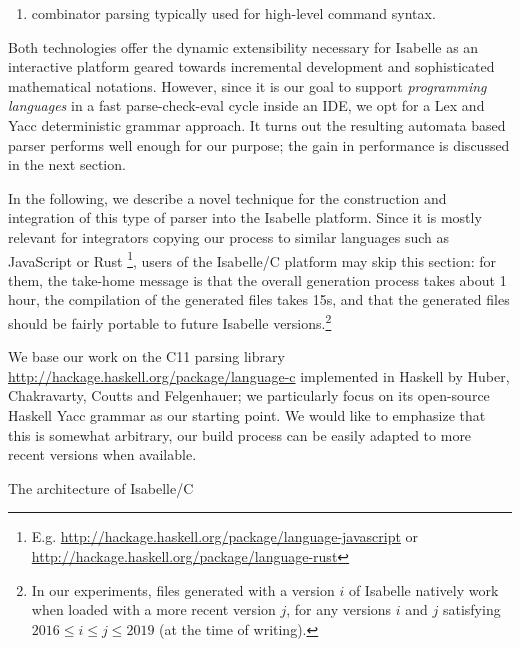 \begin{isabellebody}
\begin{isamarkuptext}
\begin{enumerate}
\item combinator parsing \cite{DBLP:journals/jfp/Hutton92} typically used for high-level 
command syntax.%
\end{enumerate}%
\end{isamarkuptext}\isamarkuptrue%
%
\begin{isamarkuptext}%
Both technologies offer the dynamic extensibility necessary for Isabelle as an
interactive platform geared towards incremental development and sophisticated mathematical
notations. However, since it is our goal to support \emph{programming languages} in
a fast parse-check-eval cycle inside an IDE, we opt for a Lex and Yacc deterministic grammar
approach. It turns out the resulting automata based parser performs well enough for our purpose; the
gain in performance is discussed in the next section.%
\end{isamarkuptext}\isamarkuptrue%
%
\begin{isamarkuptext}%
In the following, we describe a novel technique for the construction and integration of
this type of parser into the Isabelle platform. Since it is mostly relevant for integrators copying
our process to similar languages such as JavaScript or Rust \footnote{E.g.
\url{http://hackage.haskell.org/package/language-javascript} or
\url{http://hackage.haskell.org/package/language-rust}}, users of the
Isabelle/C platform may skip this section: for them, the take-home message is that the overall
generation process takes about 1 hour, the compilation of the generated files takes 15s, and that
the generated files should be fairly portable to future Isabelle versions.\footnote{In our
  experiments, files generated with a version $i$ of Isabelle natively work when loaded with a more
  recent version $j$, for any versions $i$ and $j$ satisfying $2016 \leq i \leq j \leq 2019$ (at the
  time of writing).}%
\end{isamarkuptext}\isamarkuptrue%
%
\begin{isamarkuptext}%
We base our work on the C11 parsing library
  \url{http://hackage.haskell.org/package/language-c} implemented in Haskell by
Huber, Chakravarty, Coutts and Felgenhauer; we particularly focus on its open-source Haskell Yacc
grammar as our starting point. We would like to emphasize that this is somewhat arbitrary, our build
process can be easily adapted to more recent versions when available.%
\end{isamarkuptext}\isamarkuptrue%
%
\begin{isamarkupfigure*}%
[label = {architecture},type = {Isa_COL.figure}, args={label = {architecture},type = {Isa_COL.figure}, Isa_COL.figure.relative_width = {70}, Isa_COL.figure.src = {figures/C11-Package-Architecture}, Isa_COL.figure.spawn_columns = {True}}]The architecture of Isabelle/C%

\end{isamarkupfigure*}
\end{isabellebody}
